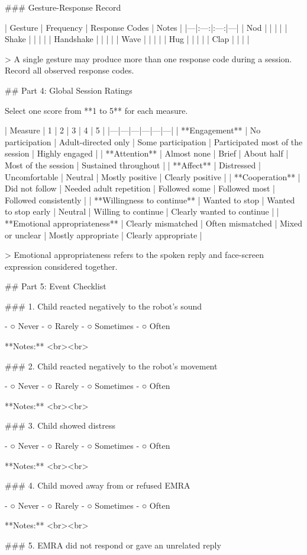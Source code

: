 ### Gesture-Response Record

| Gesture | Frequency | Response Codes | Notes |
|---|:---:|:---:|---|
| Nod | | | |
| Shake | | | |
| Handshake | | | |
| Wave | | | |
| Hug | | | |
| Clap | | | |

> A single gesture may produce more than one response code during a session. Record all observed response codes.

## Part 4: Global Session Ratings

Select one score from **1 to 5** for each measure.

| Measure | 1 | 2 | 3 | 4 | 5 |
|---|---|---|---|---|---|
| **Engagement** | No participation | Adult-directed only | Some participation | Participated most of the session | Highly engaged |
| **Attention** | Almost none | Brief | About half | Most of the session | Sustained throughout |
| **Affect** | Distressed | Uncomfortable | Neutral | Mostly positive | Clearly positive |
| **Cooperation** | Did not follow | Needed adult repetition | Followed some | Followed most | Followed consistently |
| **Willingness to continue** | Wanted to stop | Wanted to stop early | Neutral | Willing to continue | Clearly wanted to continue |
| **Emotional appropriateness** | Clearly mismatched | Often mismatched | Mixed or unclear | Mostly appropriate | Clearly appropriate |

> Emotional appropriateness refers to the spoken reply and face-screen expression considered together.

## Part 5: Event Checklist

### 1. Child reacted negatively to the robot’s sound

- ○ Never
- ○ Rarely
- ○ Sometimes
- ○ Often

**Notes:**  
<br><br>

### 2. Child reacted negatively to the robot’s movement

- ○ Never
- ○ Rarely
- ○ Sometimes
- ○ Often

**Notes:**  
<br><br>

### 3. Child showed distress

- ○ Never
- ○ Rarely
- ○ Sometimes
- ○ Often

**Notes:**  
<br><br>

### 4. Child moved away from or refused EMRA

- ○ Never
- ○ Rarely
- ○ Sometimes
- ○ Often

**Notes:**  
<br><br>

### 5. EMRA did not respond or gave an unrelated reply

